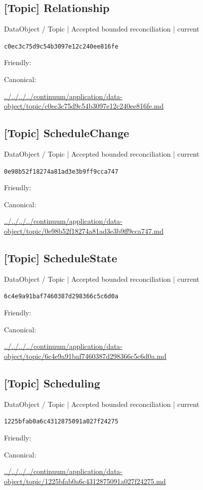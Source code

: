 \documentclass[10pt,a4paper]{article}
\begin{document}
\subsection*{[Topic] Relationship}
{\small DataObject / Topic | Accepted bounded reconciliation | current}\par
\texttt{c0ec3c75d9c54b3097e12c240ee816fe}\par
Friendly: \par
Canonical: \par
{\footnotesize\url{../../../../continuum/application/data-object/topic/c0ec3c75d9c54b3097e12c240ee816fe.md}}\par
\subsection*{[Topic] ScheduleChange}
{\small DataObject / Topic | Accepted bounded reconciliation | current}\par
\texttt{0e98b52f18274a81ad3e3b9ff9cca747}\par
Friendly: \par
Canonical: \par
{\footnotesize\url{../../../../continuum/application/data-object/topic/0e98b52f18274a81ad3e3b9ff9cca747.md}}\par
\subsection*{[Topic] ScheduleState}
{\small DataObject / Topic | Accepted bounded reconciliation | current}\par
\texttt{6c4e9a91baf7460387d298366c5c6d0a}\par
Friendly: \par
Canonical: \par
{\footnotesize\url{../../../../continuum/application/data-object/topic/6c4e9a91baf7460387d298366c5c6d0a.md}}\par
\subsection*{[Topic] Scheduling}
{\small DataObject / Topic | Accepted bounded reconciliation | current}\par
\texttt{1225bfab0a6c4312875091a027f24275}\par
Friendly: \par
Canonical: \par
{\footnotesize\url{../../../../continuum/application/data-object/topic/1225bfab0a6c4312875091a027f24275.md}}\par
\end{document}

